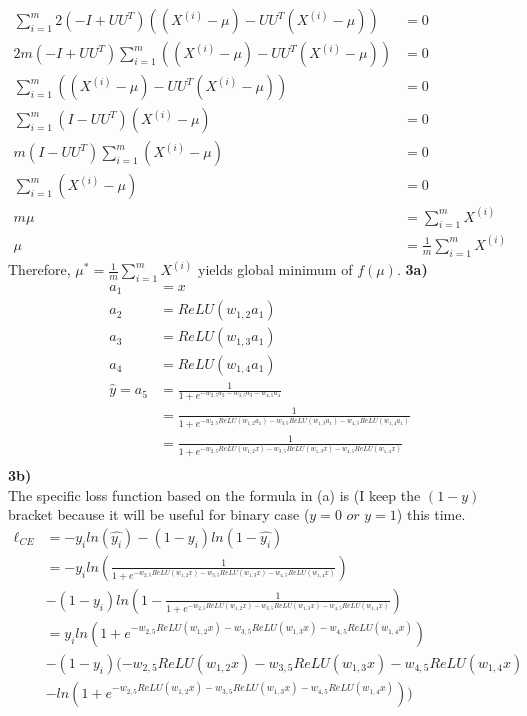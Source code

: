 \documentclass[12pt]{article}
\begin{document}
\begin{align*}
\sum_{i=1}^{m}2(-I + UU^{T})((X^{(i)} - \mu ) - UU^{T}(X^{(i)} - \mu)) &= 0\\
2m(-I + UU^{T})\sum_{i=1}^{m}((X^{(i)} - \mu ) - UU^{T}(X^{(i)} - \mu)) &= 0\\
\sum_{i=1}^{m}((X^{(i)} - \mu ) - UU^{T}(X^{(i)} - \mu)) &= 0\\
\sum_{i=1}^{m}(I-UU^{T})(X^{(i)}-\mu) &= 0\\
m(I-UU^{T})\sum_{i=1}^{m}(X^{(i)}-\mu) &= 0\\
\sum_{i=1}^{m}(X^{(i)}-\mu) &= 0\\
m\mu &= \sum_{i=1}^{m}X^{(i)}\\
\mu &= \frac{1}{m}\sum_{i=1}^{m}X^{(i)}
\end{align*}
Therefore, $\mu^{*} = \frac{1}{m}\sum_{i=1}^{m}X^{(i)}$ yields global minimum of $f(\mu)$.
\newpage
\textbf{3a)}\\
\begin{align*}
a_{1} &= x\\
a_{2} &= ReLU(w_{1, 2}a_{1})\\
a_{3} &= ReLU(w_{1, 3}a_{1})\\
a_{4} &= ReLU(w_{1, 4}a_{1})\\
\hat{y} = a_{5} &= \frac{1}{1+e^{-w_{2, 5}a_{2}-w_{3, 5}a_{3}-w_{4, 5}a_{4}}}\\
&= \frac{1}{1+e^{-w_{2, 5}ReLU(w_{1, 2}a_{1})-w_{3, 5}ReLU(w_{1, 3}a_{1})-w_{4, 5}ReLU(w_{1, 4}a_{1})}}\\
&= \frac{1}{1+e^{-w_{2, 5}ReLU(w_{1, 2}x)-w_{3, 5}ReLU(w_{1, 3}x)-w_{4, 5}ReLU(w_{1, 4}x)}}\\
\end{align*}
\textbf{3b)}\\
The specific loss function based on the formula in (a) is (I keep the $(1-y)$ bracket because it will be useful for binary case ($y=0 \textit{ or } y=1$) this time.
\begin{align*}
\ell_{CE} &= -y_{i}ln(\hat{y_{i}}) - (1-y_{i})ln(1-\hat{y_{i}})\\
&= -y_{i}ln(\frac{1}{1+e^{-w_{2, 5}ReLU(w_{1, 2}x)-w_{3, 5}ReLU(w_{1, 3}x)-w_{4, 5}ReLU(w_{1, 4}x)}})\\ & -(1-y_{i})ln(1-\frac{1}{1+e^{-w_{2, 5}ReLU(w_{1, 2}x)-w_{3, 5}ReLU(w_{1, 3}x)-w_{4, 5}ReLU(w_{1, 4}x)}})\\
&= y_{i}ln(1+e^{-w_{2, 5}ReLU(w_{1, 2}x)-w_{3, 5}ReLU(w_{1, 3}x)-w_{4, 5}ReLU(w_{1, 4}x)})\\ & -(1-y_{i})(-w_{2, 5}ReLU(w_{1, 2}x)-w_{3, 5}ReLU(w_{1, 3}x)-w_{4, 5}ReLU(w_{1, 4}x) \\&- ln(1 + e^{-w_{2, 5}ReLU(w_{1, 2}x)-w_{3, 5}ReLU(w_{1, 3}x)-w_{4, 5}ReLU(w_{1, 4}x)}))
\end{align*}
\end{document}
